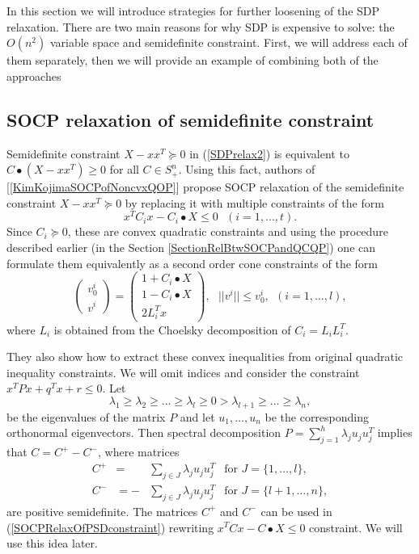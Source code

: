 \documentclass[12pt]{book}
\theoremstyle{definition}
\begin{document}
In this section we will introduce strategies for further loosening of the SDP relaxation. There are two main reasons for why SDP is expensive to solve: the $O(n^2)$ variable space and semidefinite constraint. First, we will address each of them separately, then we will provide an example of combining both of the approaches

\subsection{SOCP relaxation of semidefinite constraint}

Semidefinite constraint $X-xx^T\succeq 0$  in (\ref{SDPrelax2}) is equivalent to $C\bullet(X-xx^T)\geq 0$ for all $C\in S^n_+$. Using this fact, authors of  [\ref{KimKojimaSOCPofNoncvxQOP}] propose SOCP relaxation of the semidefinite constraint $X-xx^T\succeq 0$ by replacing it with multiple constraints of the form 
\begin{equation}
\label{SOCPrelaxedSemidefiniteConstraint}
x^TC_ix-C_i\bullet X \leq 0 \ \ \ (i=1,\dots ,t).
\end{equation}
Since $C_i\succeq 0$, these are convex quadratic constraints and using the procedure described earlier (in the Section \ref{SectionRelBtwSOCPandQCQP}) one can formulate them equivalently as a second order cone constraints of the form
\begin{equation}
\label{SOCPRelaxOfPSDconstraint}
\left(\begin{array}{c}
v^i_0\\
v^i
\end{array}\right)
= \left(\begin{array}{c}
1+C_i\bullet X\\
1-C_i\bullet X \\
2L_i^Tx
\end{array}\right), \ \ \ ||v^i||\leq v^i_0, \ \ (i  = 1,\dots ,l),
\end{equation}
where $L_i$ is obtained from the Choelsky decomposition of $C_i = L_iL_i^T.$

 They also show how to extract these convex inequalities from original quadratic inequality constraints. 
 We will omit indices and consider the constraint $x^TPx + q^Tx + r \leq 0$. Let
\begin{equation}
\label{SOCPeigenVals}
\lambda_1 \geq \lambda_2 \geq \dots \geq \lambda_l \geq 0 > \lambda_{l+1} \geq \dots \geq \lambda_n,
\end{equation}
be the eigenvalues of the matrix $P$ and let $u_1,\dots, u_n$ be the corresponding orthonormal eigenvectors.
Then spectral decomposition $P = \sum_{j = 1}^{h}\lambda_j u_ju_j^T$ implies that $C = C^+ - C^-$, where matrices
\begin{eqnarray*}
C^+  &=  &  \sum_{j \in J} \lambda_j  u_ju_j^T \ \ \mbox{ for } J = \{ 1,\dots , l\}, \\
C^-  &=  - & \sum_{j \in J} \lambda_j u_ju_j^T \ \ \mbox{ for } J = \{ l+1,\dots , n\},
\end{eqnarray*}
are positive semidefinite. The matrices $C^+$ and $C^-$ can be used in (\ref{SOCPRelaxOfPSDconstraint}) rewriting $x^TCx-C\bullet X \leq 0$ constraint. We will use this idea later.
\end{document}
